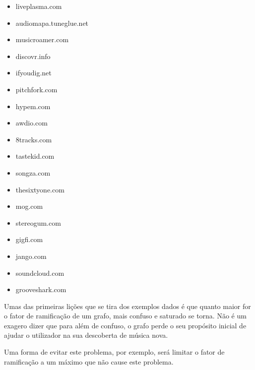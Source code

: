 \begin{itemize}
  \item liveplasma.com
  \item audiomapa.tuneglue.net
  \item musicroamer.com
  \item discovr.info
  \item ifyoudig.net
  \item pitchfork.com
  \item hypem.com
  \item awdio.com
  \item 8tracks.com
  \item tastekid.com
  \item songza.com
  \item thesixtyone.com
  \item mog.com
  \item stereogum.com
  \item gigfi.com
  \item jango.com
  \item soundcloud.com
  \item grooveshark.com
\end{itemize}


Umas das primeiras lições que se tira dos exemplos dados é que quanto maior for o fator de ramificação de um grafo, mais confuso e saturado se torna.
Não é um exagero dizer que para além de confuso, o grafo perde o seu propósito inicial de ajudar o utilizador na sua descoberta de música nova.

Uma forma de evitar este problema, por exemplo, será limitar o fator de ramificação a um máximo que não cause este problema.